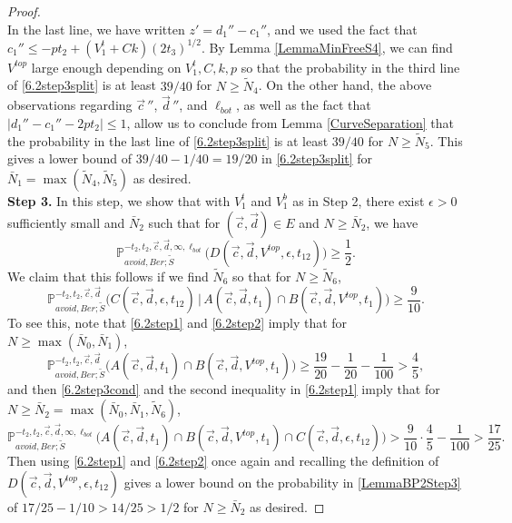 \begin{proof}
\begin{equation}
	\end{equation}
	In the last line, we have written $z' = d_1'' - c_1''$, and we used the fact that $c_1'' \leq -pt_2 + (V_1^t + Ck)(2t_3)^{1/2}$. By Lemma \ref{LemmaMinFreeS4}, we can find $V^{top}$ large enough depending on $V_1^t,C,k,p$ so that the probability in the third line of \eqref{6.2step3split} is at least $39/40$ for $N\geq\tilde{N}_4$. On the other hand, the above observations regarding $\vec{c}\,''$, $\vec{d}\,''$, and $\ell_{bot}$, as well as the fact that $|d_1'' - c_1'' - 2pt_2| \leq 1$, allow us to conclude from Lemma \ref{CurveSeparation} that the probability in the last line of \eqref{6.2step3split} is at least $39/40$ for $N\geq\tilde{N}_5$. This gives a lower bound of $39/40 - 1/40 = 19/20$ in \eqref{6.2step3split} for $\bar{N}_1 = \max(\tilde{N}_4,\tilde{N}_5)$ as desired.\\
	
	{\bf \raggedleft Step 3.} In this step, we show that with $V_1^t$ and $V_1^b$ as in Step 2, there exist $\epsilon > 0$ sufficiently small and $\bar{N}_2$ such that for $(\vec{c}, \vec{d}) \in E$ and $N\geq\bar{N}_2$, we have
	\begin{equation}\label{LemmaBP2Step3}
	\mathbb{P}^{-t_2,t_2,\vec{c},\vec{d},\infty,\ell_{bot}}_{avoid,Ber;\tilde S}\big(D(\vec{c},\vec{d},V^{top},\epsilon,t_{12}) \big) \geq \frac{1}{2}.
	\end{equation}
	We claim that this follows if we find $\tilde{N}_6$ so that for $N\geq\tilde{N}_6$,
	\begin{equation}\label{6.2step3cond}
	\mathbb{P}^{-t_2,t_2,\vec{c},\vec{d}}_{avoid,Ber;\tilde S}\big(C(\vec{c},\vec{d},\epsilon,t_{12})\,|\,A(\vec{c},\vec{d},t_1) \cap B(\vec{c},\vec{d},V^{top},t_1)\big) \geq \frac{9}{10}.
	\end{equation}
	To see this, note that \eqref{6.2step1} and \eqref{6.2step2} imply that for $N\geq\max(\bar{N}_0,\bar{N}_1)$,
	\[
	\mathbb{P}^{-t_2,t_2,\vec{c},\vec{d}}_{avoid,Ber;\tilde S}\big(A(\vec{c},\vec{d},t_1) \cap B(\vec{c},\vec{d},V^{top},t_1)\big) \geq \frac{19}{20} - \frac{1}{20} - \frac{1}{100} > \frac{4}{5},
	\]
	and then \eqref{6.2step3cond} and the second inequality in \eqref{6.2step1} imply that for $N\geq \bar{N}_2 = \max(\bar{N}_0,\bar{N}_1,\tilde{N}_6)$,
	\[
	\mathbb{P}^{-t_2,t_2,\vec{c},\vec{d},\infty,\ell_{bot}}_{avoid,Ber;\tilde S}\big(A(\vec{c},\vec{d},t_1) \cap B(\vec{c},\vec{d},V^{top},t_1) \cap C(\vec{c},\vec{d},\epsilon,t_{12})\big) > \frac{9}{10}\cdot\frac{4}{5} - \frac{1}{100} > \frac{17}{25}.
	\]
	Then using \eqref{6.2step1} and \eqref{6.2step2} once again and recalling the definition of $D(\vec{c},\vec{d},V^{top},\epsilon,t_{12}) $ gives a lower bound on the probability in \eqref{LemmaBP2Step3} of $17/25 - 1/10 > 14/25 > 1/2$ for $N\geq\bar{N}_2$ as desired. 
	

\end{proof}
